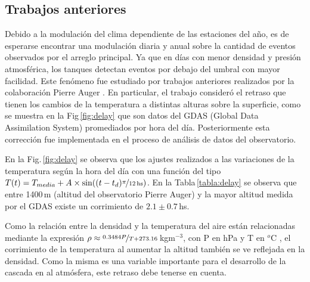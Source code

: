 \subsection{Trabajos anteriores}

Debido a la modulación del clima dependiente de las estaciones del año, es de esperarse encontrar una modulación diaria y anual sobre la cantidad de eventos observados por el arreglo principal. Ya que en días con menor densidad y presión atmosférica, los tanques detectan eventos por debajo del umbral con mayor facilidad. Este fenómeno fue estudiado por trabajos anteriores realizados por la colaboración Pierre Auger \cite{aab2017impact} \cite{collaboration2009atmospheric}. En particular, el trabajo \cite{aab2017impact} consideró el retraso que tienen los cambios de  la temperatura a distintas alturas sobre la superficie, como se muestra en la Fig\,\ref{fig:delay} que son datos del GDAS (Global Data Assimilation System) promediados por hora del día. Posteriormente esta corrección fue implementada en el proceso  de análisis de datos del observatorio.


En la Fig.\,\ref{fig:delay} se observa que los ajustes realizados a las variaciones de la temperatura  según la hora del día con una función del tipo $T(t) = T_{media} + A\times \sin((t-t_d)\nicefrac{\pi}{12\,\text{hs}})$.  En la Tabla\,\ref{tabla:delay} se observa que entre 1400\,m (altitud del observatorio Pierre Auger) y la mayor altitud medida por el GDAS existe un corrimiento de $2.1\pm0.7\,$hs.

Como la relación entre la densidad y la temperatura del aire están relacionadas mediante la expresión $\rho \approx \nicefrac{0.3484P}{T +273.16}\,$kgm$^{-3}$, con P en hPa y T en  $^o$C \cite{aab2017impact}, el corrimiento de la temperatura al aumentar la altitud también se ve reflejada en la densidad. Como la misma es una variable importante para el desarrollo de la cascada en al atmósfera, este retraso debe tenerse en cuenta.

